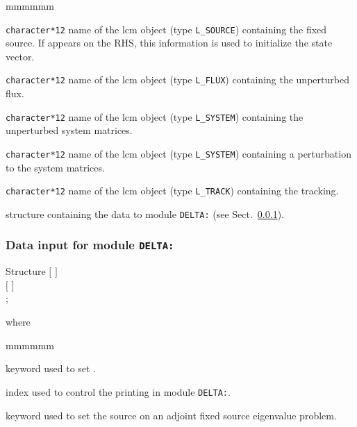 \begin{ListeDeDescription}{mmmmmm}

\item[\dusa{GPT}] {\tt character*12} name of the {\sc lcm} object (type {\tt L\_SOURCE}) containing the fixed source. If
 appears on the RHS, this information is used to initialize the state vector.

\item[\dusa{FLUX0}] {\tt character*12} name of the {\sc lcm} object (type {\tt L\_FLUX}) containing the unperturbed flux.

\item[\dusa{SYST0}] {\tt character*12} name of the {\sc lcm} object (type {\tt L\_SYSTEM}) containing the unperturbed system matrices.

\item[\dusa{DSYST}] {\tt character*12} name of the {\sc lcm} object (type {\tt L\_SYSTEM}) containing a perturbation to the system matrices.

\item[\dusa{TRACK}] {\tt character*12} name of the {\sc lcm} object (type {\tt L\_TRACK}) containing the {\sc tracking}.

\item[\dstr{delta\_data}] structure containing the data to module {\tt DELTA:} (see Sect.~\ref{sect:delta_data}).

\end{ListeDeDescription}

\vskip 0.2cm

\subsubsection{Data input for module {\tt DELTA:}}\label{sect:delta_data}

\begin{DataStructure}{Structure }
$[$   $]$ \\
$[$  $]$ \\
;
\end{DataStructure}

\noindent where
\begin{ListeDeDescription}{mmmmmm}

\item[\moc{EDIT}] keyword used to set .

\item[\dusa{iprint}] index used to control the printing in module {\tt DELTA:}.

\item[\moc{ADJ}] keyword used to set the source on an adjoint fixed source eigenvalue problem.

\end{ListeDeDescription}
\clearpage

